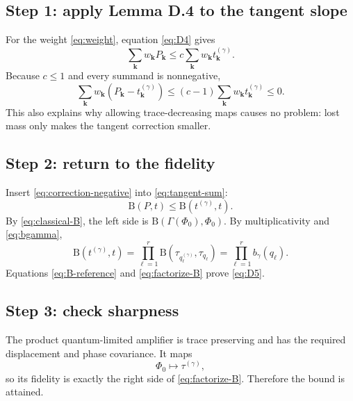 \documentclass[11pt]{article}
\newcommand{\B}{\mathrm B}
\begin{document}
\subsection*{Step 1: apply Lemma D.4 to the tangent slope}

For the weight \eqref{eq:weight}, equation \eqref{eq:D4} gives
\begin{equation}\label{eq:weighted-order}
  \sum_{\mathbf k}w_{\mathbf k}P_{\mathbf k}
  \leq
  c\sum_{\mathbf k}w_{\mathbf k}t_{\mathbf k}^{(\gamma)}.
\end{equation}
Because $c\leq1$ and every summand is nonnegative,
\begin{equation}\label{eq:correction-negative}
  \sum_{\mathbf k}w_{\mathbf k}
      (P_{\mathbf k}-t_{\mathbf k}^{(\gamma)})
  \leq(c-1)
      \sum_{\mathbf k}w_{\mathbf k}t_{\mathbf k}^{(\gamma)}
  \leq0.
\end{equation}
This also explains why allowing trace-decreasing maps causes no problem:
lost mass only makes the tangent correction smaller.

\subsection*{Step 2: return to the fidelity}

Insert \eqref{eq:correction-negative} into \eqref{eq:tangent-sum}:
\begin{equation}\label{eq:B-reference}
  \B(P,t)\leq\B(t^{(\gamma)},t).
\end{equation}
By \eqref{eq:classical-B}, the left side is
$\B(\Gamma(\Phi_0),\Phi_0)$.  By multiplicativity and
\eqref{eq:bgamma},
\begin{equation}\label{eq:factorize-B}
  \B(t^{(\gamma)},t)
  =\prod_{\ell=1}^r
    \B(\tau_{q_\ell^{(\gamma)}},\tau_{q_\ell})
  =\prod_{\ell=1}^r b_\gamma(q_\ell).
\end{equation}
Equations \eqref{eq:B-reference} and \eqref{eq:factorize-B} prove
\eqref{eq:D5}.

\subsection*{Step 3: check sharpness}

The product quantum-limited amplifier is trace preserving and has the
required displacement and phase covariance.  It maps
\[
  \Phi_0\longmapsto\tau^{(\gamma)},
\]
so its fidelity is exactly the right side of \eqref{eq:factorize-B}.
Therefore the bound is attained.
\end{document}
